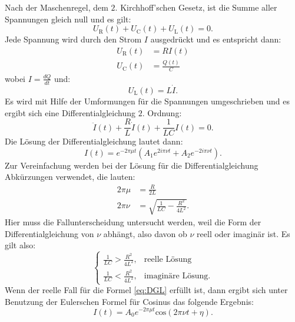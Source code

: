 Nach der Maschenregel, dem $2.$ Kirchhoff'schen Gesetz, ist die Summe aller Spannungen gleich null und es gilt:
\begin{equation*}
U_{\text{R}}(t) + U_{\text{C}}(t) + U_{\text{L}}(t) = 0.
\end{equation*}
Jede Spannung wird durch den Strom $I$ ausgedrückt und es entspricht dann:
\begin{align*}
U_{\text{R}}(t) &= RI(t) \\
U_{\text{C}}(t) &= \frac{Q(t)}{C}
\end{align*} 
wobei $I = \frac{dQ}{dt}$ und:
\begin{equation*}
U_{\text{L}}(t) = L\dot{I}.
\end{equation*}
Es wird mit Hilfe der Umformungen für die Spannungen umgeschrieben und es ergibt sich eine Differentialgleichung $2.$ Ordnung:
\begin{equation*}
\ddot{I}(t) + \frac{R}{L}\dot{I}(t) + \frac{1}{LC}I(t) = 0.
\end{equation*}
Die Lösung der Differentialgleichung lautet dann:
\begin{equation}
\label{eq:DGL}
I(t) = e^{-2 \pi \mu t}(A_{1}e^{2i \pi \nu t}+A_{2}e^{-2i \pi \nu t}).
\end{equation}
Zur Vereinfachung werden bei der Lösung für die Differentialgleichung Abkürzungen verwendet, die lauten:
\begin{equation}
\begin{aligned}
2 \pi \mu &= \frac{R}{2L} \\
2 \pi \nu &= \sqrt{\frac{1}{LC}-\frac{R^{2}}{4L^{2}}}.
\label{eq:Fallunterscheidung}
\end{aligned}
\end{equation}
Hier muss die Fallunterscheidung untersucht werden, weil die Form der Differentialgleichung von $\nu$ abhängt, also davon ob $\nu$ reell oder imaginär ist.
Es gilt also:
\begin{equation*}
\begin{cases}
\frac{1}{LC} > \frac{R^{2}}{4L^{2}}, & \text{reelle Lösung} \\
\frac{1}{LC} < \frac{R^{2}}{4L^{2}}, & \text{imaginäre Lösung}.
\end{cases}
\end{equation*}
Wenn der reelle Fall für die Formel \ref{eq:DGL} erfüllt ist, dann ergibt sich unter Benutzung der Eulerschen Formel für Cosinus das folgende Ergebnis:
\begin{equation}
\label{eq:reell}
I(t) = A_{0}e^{-2\pi\mu t}\text{cos}(2\pi\nu t+\eta).
\end{equation}

